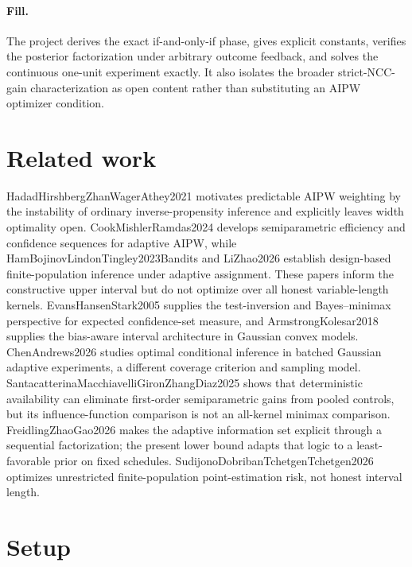 \documentclass{article}
\begin{document}
\paragraph{Fill.} The project derives the exact if-and-only-if phase, gives explicit constants, verifies the posterior factorization under arbitrary outcome feedback, and solves the continuous one-unit experiment exactly. It also isolates the broader strict-NCC-gain characterization as open content rather than substituting an AIPW optimizer condition.

\section{Related work}

HadadHirshbergZhanWagerAthey2021 motivates predictable AIPW weighting by the instability of ordinary inverse-propensity inference and explicitly leaves width optimality open. CookMishlerRamdas2024 develops semiparametric efficiency and confidence sequences for adaptive AIPW, while HamBojinovLindonTingley2023Bandits and LiZhao2026 establish design-based finite-population inference under adaptive assignment. These papers inform the constructive upper interval but do not optimize over all honest variable-length kernels. EvansHansenStark2005 supplies the test-inversion and Bayes--minimax perspective for expected confidence-set measure, and ArmstrongKolesar2018 supplies the bias-aware interval architecture in Gaussian convex models. ChenAndrews2026 studies optimal conditional inference in batched Gaussian adaptive experiments, a different coverage criterion and sampling model. SantacatterinaMacchiavelliGironZhangDiaz2025 shows that deterministic availability can eliminate first-order semiparametric gains from pooled controls, but its influence-function comparison is not an all-kernel minimax comparison. FreidlingZhaoGao2026 makes the adaptive information set explicit through a sequential factorization; the present lower bound adapts that logic to a least-favorable prior on fixed schedules. SudijonoDobribanTchetgenTchetgen2026 optimizes unrestricted finite-population point-estimation risk, not honest interval length.

\section{Setup}
\end{document}
